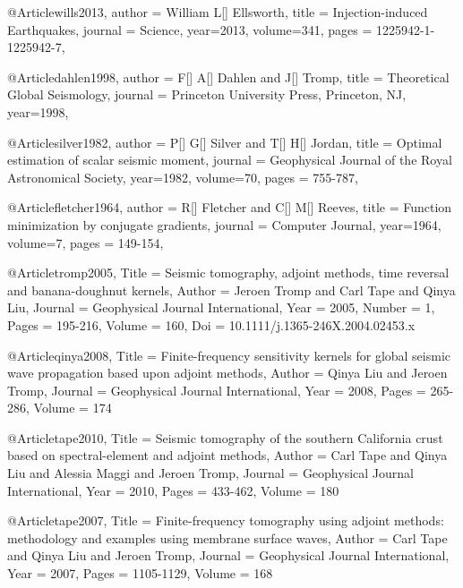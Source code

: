 @Article{wills2013,
  author =	 {William L[] Ellsworth},
  title =	 {Injection-induced Earthquakes},
  journal =	 {Science},
  year=2013,
  volume=341,
  pages =	 {1225942-1-1225942-7},
}

@Article{dahlen1998,
  author =	 {F[] A[] Dahlen and J[] Tromp},
  title =	 {Theoretical Global Seismology},
  journal =	 {Princeton University Press, Princeton, NJ},
  year=1998,
}

@Article{silver1982,
  author =	 {P[] G[] Silver and T[] H[] Jordan},
  title =	 {Optimal estimation of scalar seismic moment},
  journal =	 {Geophysical Journal of the Royal Astronomical Society},
  year=1982,
  volume=70,
  pages =	 {755-787},
}


@Article{fletcher1964,
  author =	 {R[] Fletcher and C[] M[] Reeves},
  title =	 {Function minimization by conjugate gradients},
  journal =	 {Computer Journal},
  year=1964,
  volume=7,
  pages =	 {149-154},
}

@Article{tromp2005,
  Title                    = {Seismic tomography, adjoint methods, time reversal and banana-doughnut kernels},
  Author                   = {Jeroen Tromp and Carl Tape and Qinya Liu},
  Journal                  = {Geophysical Journal International},
  Year                     = {2005},
  Number                   = {1},
  Pages                    = {195-216},
  Volume                   = {160},
  Doi                      = {10.1111/j.1365-246X.2004.02453.x}
}

@Article{qinya2008,
  Title                    = {Finite-frequency sensitivity kernels for global seismic wave propagation based upon adjoint methods},
  Author                   = {Qinya Liu and Jeroen Tromp},
  Journal                  = {Geophysical Journal International},
  Year                     = {2008},
  Pages                    = {265-286},
  Volume                   = {174}
}


@Article{tape2010,
  Title                    = {Seismic tomography of the southern {C}alifornia crust based on spectral-element and adjoint methods},
  Author                   = {Carl Tape and Qinya Liu and Alessia Maggi and Jeroen Tromp},
  Journal                  = Geophysical Journal International,
  Year                     = {2010},
  Pages                    = {433-462},
  Volume                   = {180}
}

@Article{tape2007,
  Title                    = {Finite-frequency tomography using adjoint methods: methodology and examples using membrane surface waves},
  Author                   = {Carl Tape and Qinya Liu and Jeroen Tromp},
  Journal                  = Geophysical Journal International,
  Year                     = {2007},
  Pages                    = {1105-1129},
  Volume                   = {168}
}


